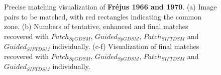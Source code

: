 \begin{figure}[htbp]
\begin{center}
		\caption{Precise matching visualization of \textbf{Fr{\'e}jus 1966 and 1970}. (a) Image pairs to be matched, with red rectangles indicating the common zone. (b) Numbers of tentative, enhanced and final matches recovered with $Patch_{SpGDSM}$, $Guided_{SpGDSM}$, $Patch_{SIFTDSM}$ and $Guided_{SIFTDSM}$ individually. (c-f) Visualization of final matches recovered with $Patch_{SpGDSM}$, $Guided_{SpGDSM}$, $Patch_{SIFTDSM}$ and $Guided_{SIFTDSM}$ individually.}
		\label{MatchVizFrejus1966-1970}
	\end{center}
\end{figure} 


